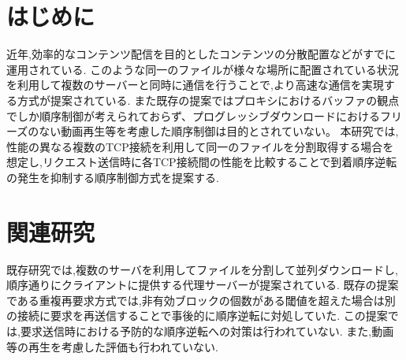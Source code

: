 \documentclass{ltjsarticle}
\begin{document}
 
\vspace{-5mm}
\section{はじめに}
\vspace{-2mm}
近年,効率的なコンテンツ配信を目的としたコンテンツの分散配置などがすでに運用されている.
このような同一のファイルが様々な場所に配置されている状況を利用して複数のサーバーと同時に通信を行うことで,より高速な通信を実現する方式が提案されている.\cite{mhttp}
また既存の提案ではプロキシにおけるバッファの観点でしか順序制御が考えられておらず、プログレッシブダウンロードにおけるフリーズのない動画再生等を考慮した順序制御は目的とされていない。
本研究では,性能の異なる複数のTCP接続を利用して同一のファイルを分割取得する場合を想定し,リクエスト送信時に各TCP接続間の性能を比較することで到着順序逆転の発生を抑制する順序制御方式を提案する.
\vspace{-5mm}

\section{関連研究}
\vspace{-2mm}
既存研究では,複数のサーバを利用してファイルを分割して並列ダウンロードし,順序通りにクライアントに提供する代理サーバーが提案されている.\cite{proxy}
既存の提案である重複再要求方式では,非有効ブロックの個数がある閾値を超えた場合は別の接続に要求を再送信することで事後的に順序逆転に対処していた.
この提案では,要求送信時における予防的な順序逆転への対策は行われていない.
また,動画等の再生を考慮した評価も行われていない.
\vspace{-5mm}
\end{document}
